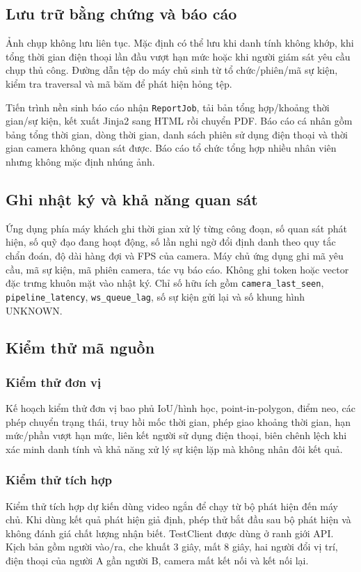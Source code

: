 \subsection{Lưu trữ bằng chứng và báo cáo}
Ảnh chụp không lưu liên tục. Mặc định có thể lưu khi danh tính không khớp, khi tổng thời gian điện thoại lần đầu vượt hạn mức hoặc khi người giám sát yêu cầu chụp thủ công. Đường dẫn tệp do máy chủ sinh từ tổ chức/phiên/mã sự kiện, kiểm tra traversal và mã băm để phát hiện hỏng tệp.

Tiến trình nền sinh báo cáo nhận \texttt{ReportJob}, tải bản tổng hợp/khoảng thời gian/sự kiện, kết xuất Jinja2 sang HTML rồi chuyển PDF. Báo cáo cá nhân gồm bảng tổng thời gian, dòng thời gian, danh sách phiên sử dụng điện thoại và thời gian camera không quan sát được. Báo cáo tổ chức tổng hợp nhiều nhân viên nhưng không mặc định nhúng ảnh.

\subsection{Ghi nhật ký và khả năng quan sát}
Ứng dụng phía máy khách ghi thời gian xử lý từng công đoạn, số quan sát phát hiện, số quỹ đạo đang hoạt động, số lần nghi ngờ đổi định danh theo quy tắc chẩn đoán, độ dài hàng đợi và FPS của camera. Máy chủ ứng dụng ghi mã yêu cầu, mã sự kiện, mã phiên camera, tác vụ báo cáo. Không ghi token hoặc vector đặc trưng khuôn mặt vào nhật ký. Chỉ số hữu ích gồm \texttt{camera\_last\_seen}, \texttt{pipeline\_latency}, \texttt{ws\_queue\_lag}, số sự kiện gửi lại và số khung hình UNKNOWN.

\subsection{Kiểm thử mã nguồn}
\subsubsection{Kiểm thử đơn vị}
Kế hoạch kiểm thử đơn vị bao phủ IoU/hình học, point-in-polygon, điểm neo, các phép chuyển trạng thái, truy hồi mốc thời gian, phép giao khoảng thời gian, hạn mức/phần vượt hạn mức, liên kết người sử dụng điện thoại, biên chênh lệch khi xác minh danh tính và khả năng xử lý sự kiện lặp mà không nhân đôi kết quả.

\subsubsection{Kiểm thử tích hợp}
Kiểm thử tích hợp dự kiến dùng video ngắn để chạy từ bộ phát hiện đến máy chủ. Khi dùng kết quả phát hiện giả định, phép thử bắt đầu sau bộ phát hiện và không đánh giá chất lượng nhận biết. TestClient được dùng ở ranh giới API. Kịch bản gồm người vào/ra, che khuất 3 giây, mất 8 giây, hai người đổi vị trí, điện thoại của người A gần người B, camera mất kết nối và kết nối lại.


